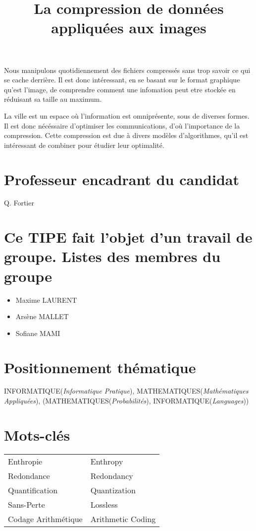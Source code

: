 \documentclass{article}
\title{La compression de donn\'ees appliqu\'ees aux images}
\begin{document}
    
\maketitle
Nous manipulons quotidiennement des fichiers compressés sans trop savoir ce qui se cache derrière. Il est donc intéressant, en se basant sur le format graphique qu'est l'image, de comprendre comment une infomation peut etre stockée en réduisant sa taille au maximum.

La ville est un espace où l'information est omniprésente, sous de diverses formes. Il est donc nécéssaire d'optimiser les communications, d'où l'importance de la compression. Cette compression est due à divers modèles d'algorithmes, qu'il est intéressant de combiner pour étudier leur optimalité. 

\section*{Professeur encadrant du candidat}
Q. Fortier

\section*{Ce TIPE fait l'objet d'un travail de groupe. \newline Listes des membres du groupe}
\begin{itemize}
    \item Maxime LAURENT
    \item Arsène MALLET
    \item Sofiane MAMI
\end{itemize}

\section*{Positionnement th\'ematique}
INFORMATIQUE(\textit{Informatique Pratique}), MATHEMATIQUES(\textit{Mathématiques Appliquées}), (MATHEMATIQUES(\textit{Probabilités}), INFORMATIQUE(\textit{Languages}))

\section*{Mots-cl\'es}

\begin{tabular}{l l} 
    Enthropie & Enthropy \\
    Redondance & Redondancy \\
    Quantification & Quantization \\
    Sans-Perte & Lossless \\
    Codage Arithmétique & Arithmetic Coding \\
    \end{tabular}
\end{document}

